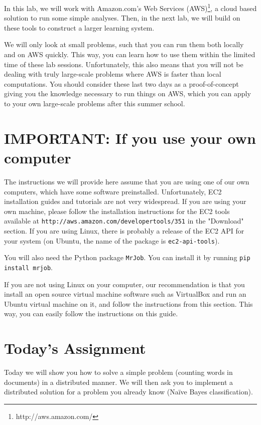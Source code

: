In this lab, we will work with Amazon.com's Web Services (AWS)\footnote{http://aws.amazon.com/}, a cloud based solution
to run some simple analyses. Then, in the next lab, we will build on these
tools to construct a larger learning system.

We will only look at small problems, such that you can run them both locally and on AWS quickly. This way, you can learn how to use them within the limited time of these lab sessions. Unfortunately, this also means that you will not be dealing with truly large-scale problems where AWS is faster than local computations. You should consider these last two days as a proof-of-concept giving you the knowledge necessary to run things on AWS, which you can apply to your own large-scale problems after this summer school.

\section*{IMPORTANT: If you use your own computer}

The instructions we will provide here assume that you are using one of our own computers, which have some software preinstalled. Unfortunately, EC2 installation guides and tutorials are not very widespread. If you are using your own machine, please follow the installation instructions for the EC2 tools available at \texttt{http://aws.amazon.com/developertools/351} in the "Download" section. If you are using Linux, there is probably a release of the EC2 API for your system (on Ubuntu, the name of the package is \texttt{ec2-api-tools}).

You will also need the Python package \texttt{MrJob}. You can install it by running \texttt{pip install mrjob}.

If you are not using Linux on your computer, our recommendation is that you install an open source virtual machine software such as VirtualBox and run an Ubuntu virtual machine on it, and follow the instructions from this section. This way, you can easily follow the instructions on this guide.

\section*{Today's Assignment}

Today we will show you how to solve a simple problem (counting words in
documents) in a distributed manner. We will then ask you to implement a
distributed solution for a problem you already know (Na\"{i}ve Bayes
classification).

